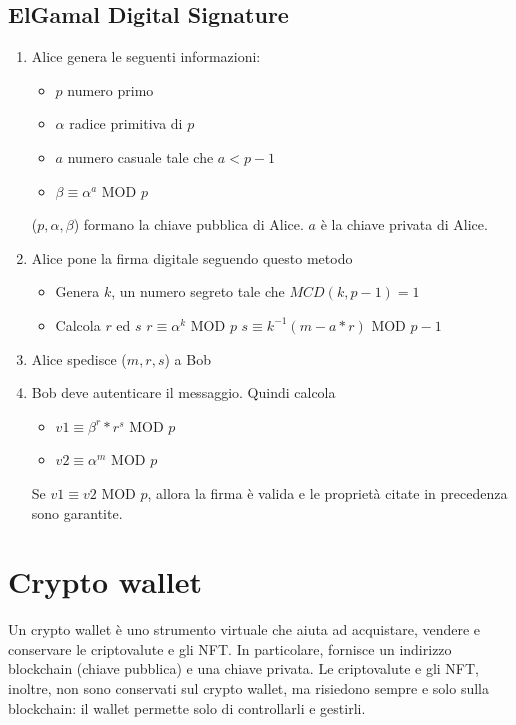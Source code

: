 \documentclass[12pt]{report}
\begin{document}
\subsection{ElGamal Digital Signature}
\begin{enumerate}[topsep=5pt, itemsep=0pt]
    \item Alice genera le seguenti informazioni:
        \begin{itemize}[topsep=-2pt, itemsep=0pt, label={$-$}]
            \item \(p\) numero primo
            \item \(\alpha\) radice primitiva di \(p\)
            \item \(a\) numero casuale tale che \(a < p - 1\)
            \item \(\beta \equiv \alpha^a\) MOD \(p\)
        \end{itemize}
        (\(p, \alpha, \beta\)) formano la chiave pubblica di Alice.\newline
        \(a\) è la chiave privata di Alice.    
    \item Alice pone la firma digitale seguendo questo metodo
        \begin{itemize}[topsep=-2pt, itemsep=0pt, label={$-$}]
            \item Genera \(k\), un numero segreto tale che \(MCD(k,p-1) = 1\)
            \item Calcola \(r\) ed \(s\)\newline
            \(r \equiv \alpha^k\) MOD \(p\)\newline
            \(s \equiv k^{-1}(m - a * r)\) MOD \(p - 1\)
        \end{itemize}
    \item Alice spedisce (\(m, r, s\)) a Bob
    \item Bob deve autenticare il messaggio. Quindi calcola
        \begin{itemize}[topsep=-2pt, itemsep=0pt, label={$-$}]
            \item \(v1 \equiv \beta^r * r^s\) MOD \(p\)
            \item \(v2 \equiv \alpha^m\) MOD \(p\)
        \end{itemize}
        Se \(v1 \equiv v2\) MOD \(p\), allora la firma è valida e le proprietà citate in precedenza sono garantite. \cite{Sette}
\end{enumerate}

\section{Crypto wallet}
Un crypto wallet è uno strumento virtuale che aiuta ad acquistare, vendere e conservare le criptovalute e gli NFT. In particolare, fornisce un indirizzo blockchain (chiave pubblica) e una chiave privata.\newline
Le criptovalute e gli NFT, inoltre, non sono conservati sul crypto wallet, ma risiedono sempre e solo sulla blockchain: il wallet permette solo di controllarli e gestirli. \cite{Otto}
\end{document}
